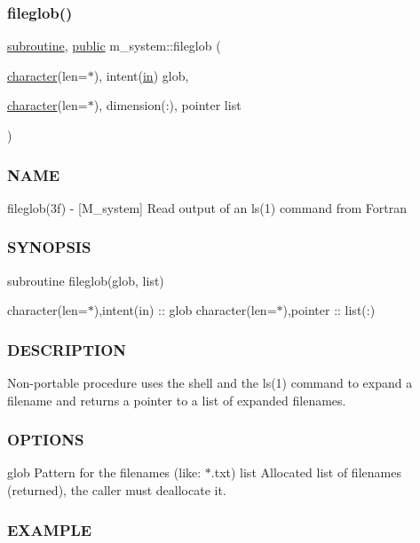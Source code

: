 \subsubsection{\texorpdfstring{fileglob()}{fileglob()}}
{\footnotesize\ttfamily \hyperlink{M__stopwatch_83_8txt_acfbcff50169d691ff02d4a123ed70482}{subroutine}, \hyperlink{M__stopwatch_83_8txt_a2f74811300c361e53b430611a7d1769f}{public} m\+\_\+system\+::fileglob (\begin{DoxyParamCaption}\item[{\hyperlink{option__stopwatch_83_8txt_abd4b21fbbd175834027b5224bfe97e66}{character}(len=$\ast$), intent(\hyperlink{M__journal_83_8txt_afce72651d1eed785a2132bee863b2f38}{in})}]{glob,  }\item[{\hyperlink{option__stopwatch_83_8txt_abd4b21fbbd175834027b5224bfe97e66}{character}(len=$\ast$), dimension(\+:), pointer}]{list }\end{DoxyParamCaption})}



\subsubsection*{N\+A\+ME}

fileglob(3f) -\/ \mbox{[}M\+\_\+system\mbox{]} Read output of an ls(1) command from Fortran \subsubsection*{S\+Y\+N\+O\+P\+S\+IS}

subroutine fileglob(glob, list)

character(len=$\ast$),intent(in) \+:\+: glob character(len=$\ast$),pointer \+:\+: list(\+:)

\subsubsection*{D\+E\+S\+C\+R\+I\+P\+T\+I\+ON}

Non-\/portable procedure uses the shell and the ls(1) command to expand a filename and returns a pointer to a list of expanded filenames. \subsubsection*{O\+P\+T\+I\+O\+NS}

glob Pattern for the filenames (like\+: $\ast$.txt) list Allocated list of filenames (returned), the caller must deallocate it.

\subsubsection*{E\+X\+A\+M\+P\+LE}


